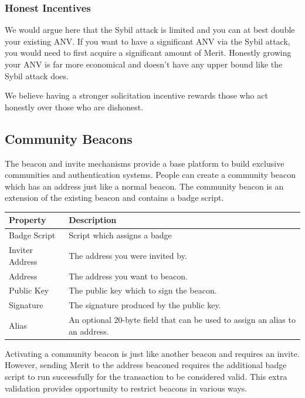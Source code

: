 \documentclass{article}
\begin{document}
\subsubsection{Honest Incentives}

We would argue here that the Sybil attack is limited and you can at best double 
your existing ANV. If you want to have a significant ANV via the Sybil attack, you
would need to first acquire a significant amount of Merit. Honestly growing your
ANV is far more economical and doesn't have any upper bound like the Sybil attack 
does.

We believe having a stronger solicitation incentive rewards those who act
honestly over those who are dishonest.

\subsection{Community Beacons}

The beacon and invite mechanisms provide a base platform to build exclusive
communities and authentication systems. People can create a community beacon
which has an address just like a normal beacon. The community beacon is an
extension of the existing beacon and contains a badge script.

\begin{center}
    \begin{tabular}{l|p{9cm}}
        Property & Description \\ \hline
        Badge Script & Script which assigns a badge \\
        Inviter Address & The address you were invited by. \\
        Address & The address you want to beacon. \\
        Public Key & The public key which to sign the beacon. \\
        Signature & The signature produced by the public key. \\
        Alias & An optional 20-byte field that can be used to assign an alias to an address.\\
    \end{tabular}
\end{center}

Activating a community beacon is just like another beacon and requires an invite.
However, sending Merit to the address beaconed requires the additional badge script to
run successfully for the transaction to be considered valid. This extra validation
provides opportunity to restrict beacons in various ways.
\end{document}

